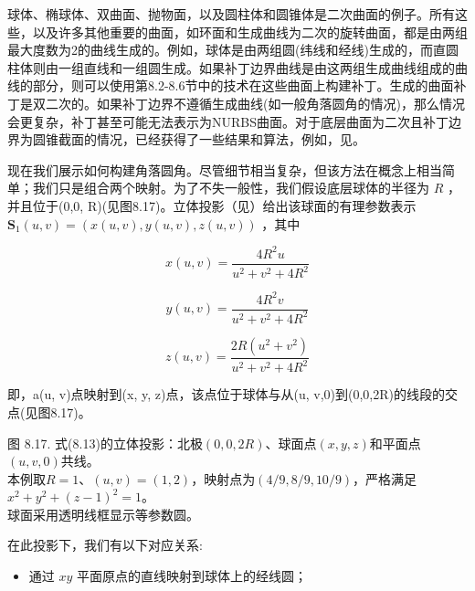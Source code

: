 \documentclass[../main.tex]{subfiles}
\begin{document}
球体、椭球体、双曲面、抛物面，以及圆柱体和圆锥体是二次曲面的例子。所有这些，以及许多其他重要的曲面，如环面和生成曲线为二次的旋转曲面，都是由两组最大度数为2的曲线生成的。例如，球体是由两组圆(纬线和经线)生成的，而直圆柱体则由一组直线和一组圆生成。如果补丁边界曲线是由这两组生成曲线组成的曲线的部分，则可以使用第8.2-8.6节中的技术在这些曲面上构建补丁。生成的曲面补丁是双二次的。如果补丁边界不遵循生成曲线(如一般角落圆角的情况)，那么情况会更复杂，补丁甚至可能无法表示为NURBS曲面。对于底层曲面为二次且补丁边界为圆锥截面的情况，已经获得了一些结果和算法，例如，见\cite{Geis90,Boeh91,Hosc92a}。

现在我们展示如何构建角落圆角。尽管细节相当复杂，但该方法在概念上相当简单；我们只是组合两个映射。为了不失一般性，我们假设底层球体的半径为 \(R\) ，并且位于(0,0, R)(见图8.17)。立体投影（见\cite{Coxe67,DoCa76}）给出该球面的有理参数表示 \({\mathbf{S}}_{1}\left( {u,v}\right)  = \left( {x\left( {u,v}\right) ,y\left( {u,v}\right) ,z\left( {u,v}\right) }\right)\) ，其中

\[
x\left( {u,v}\right)  = \frac{4{R}^{2}u}{{u}^{2} + {v}^{2} + 4{R}^{2}}
\]

\[
y\left( {u,v}\right)  = \frac{4{R}^{2}v}{{u}^{2} + {v}^{2} + 4{R}^{2}}
\]

\[
z\left( {u,v}\right)  = \frac{{2R}\left( {{u}^{2} + {v}^{2}}\right) }{{u}^{2} + {v}^{2} + 4{R}^{2}} \tag{8.13}
\]

即，a(u, v)点映射到(x, y, z)点，该点位于球体与从(u, v,0)到(0,0,2R)的线段的交点(见图8.17)。

\begin{center}
\begin{minipage}{28cm}
\vspace*{.6\baselineskip}
\centering
{}
\par\smallskip
图 8.17. 式(8.13)的立体投影：北极$(0,0,2R)$、球面点$(x,y,z)$和平面点$(u,v,0)$共线。\\
本例取$R=1$、$(u,v)=(1,2)$，映射点为$(4/9,8/9,10/9)$，严格满足$x^2+y^2+(z-1)^2=1$。\\
球面采用透明线框显示等参数圆。
\end{minipage}
\end{center}

在此投影下，我们有以下对应关系:



\begin{itemize}
\item 通过 \({xy}\) 平面原点的直线映射到球体上的经线圆；
\end{itemize}
\end{document}
